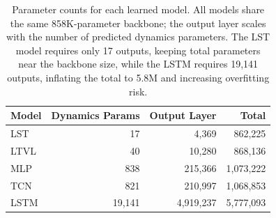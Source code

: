 \begin{table}[t]
\centering
\caption{Parameter counts for each learned model. All models share the same 858K-parameter backbone; the output layer scales with the number of predicted dynamics parameters. The LST model requires only 17 outputs, keeping total parameters near the backbone size, while the LSTM requires 19,141 outputs, inflating the total to 5.8M and increasing overfitting risk.}
\label{tab:param-counts}
\small
\begin{tabular}{@{}lrrr@{}}
\toprule
Model & Dynamics Params & Output Layer & Total \\
\midrule
LST & 17 & 4,369 & 862,225 \\
LTVL & 40 & 10,280 & 868,136 \\
MLP & 838 & 215,366 & 1,073,222 \\
TCN & 821 & 210,997 & 1,068,853 \\
LSTM & 19,141 & 4,919,237 & 5,777,093 \\
\bottomrule
\end{tabular}
\end{table}
